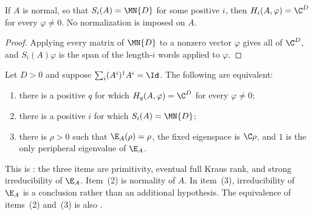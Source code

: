 \begin{lemma}
    \label{thm:paper_primitive_of_full_kraus_rank}
    \leanok
    If $A$ is normal, so that $S_i(A)=\MN{D}$ for some positive $i$, then
    $H_i(A,\varphi)=\C^D$ for every $\varphi\neq0$.  No normalization is
    imposed on $A$.
\end{lemma}

\begin{proof}
    \leanok
    Applying every matrix of $\MN{D}$ to a nonzero vector $\varphi$ gives all
    of $\C^D$, and $S_i(A)\varphi$ is the span of the length-$i$ words
    applied to $\varphi$.
\end{proof}

\begin{lemma}
    \label{thm:wielandt_proposition_three}
    \leanok
    Let $D>0$ and suppose
    $\sum_i(A^i)^\dagger A^i=\Id$. The following are equivalent:
    \begin{enumerate}
        \item there is a positive $q$ for which
              $H_q(A,\varphi)=\C^D$ for every $\varphi\neq0$;
        \item there is a positive $i$ for which $S_i(A)=\MN{D}$;
        \item there is $\rho>0$ such that $\E_A(\rho)=\rho$, the fixed
              eigenspace is $\C\rho$, and $1$ is the only peripheral
              eigenvalue of $\E_A$.
    \end{enumerate}
    This is \cite[Proposition~3]{Sanz2010Quantum}: the three items are
    primitivity, eventual full Kraus rank, and strong irreducibility of
    $\E_A$. Item~(2) is normality of $A$. In item~(3), irreducibility of
    $\E_A$ is a conclusion rather than an additional hypothesis. The
    equivalence of items~(2) and~(3) is also
    \cite[Theorems~6.7 and~6.8]{Wolf2012Quantum}.
\end{lemma}

